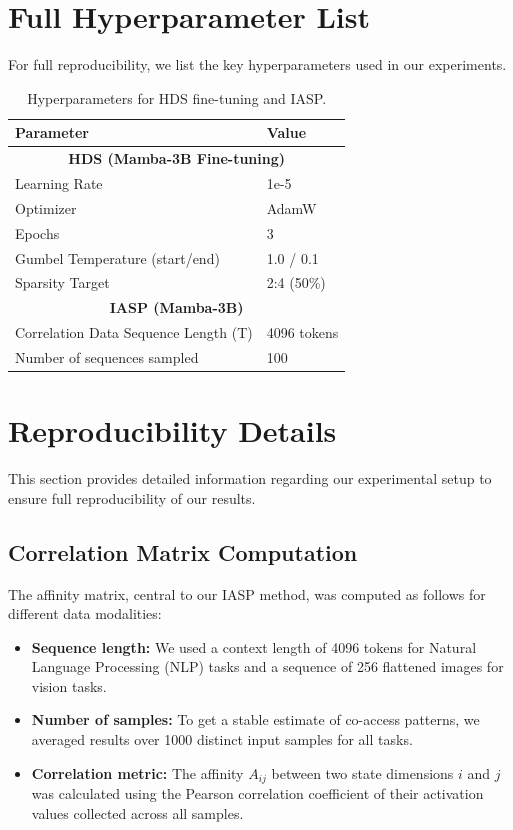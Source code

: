 \documentclass{article}
\begin{document}
\section{Full Hyperparameter List}
\label{app:hyperparams}
For full reproducibility, we list the key hyperparameters used in our experiments.
\begin{table}[htbp]
\caption{Hyperparameters for HDS fine-tuning and IASP.}
\label{tab:hyperparams}
\centering
\begin{tabular}{ll}
\toprule
\textbf{Parameter} & \textbf{Value} \\
\midrule
\multicolumn{2}{c}{\textbf{HDS (Mamba-3B Fine-tuning)}} \\
Learning Rate & 1e-5 \\
Optimizer & AdamW \\
Epochs & 3 \\
Gumbel Temperature (start/end) & 1.0 / 0.1 \\
Sparsity Target & 2:4 (50\%) \\
\midrule
\multicolumn{2}{c}{\textbf{IASP (Mamba-3B)}} \\
Correlation Data Sequence Length (T) & 4096 tokens \\
Number of sequences sampled & 100 \\
\bottomrule
\end{tabular}
\end{table}

\section{Reproducibility Details}
\label{app:reproducibility}
This section provides detailed information regarding our experimental setup to ensure full reproducibility of our results.

\subsection{Correlation Matrix Computation}
The affinity matrix, central to our IASP method, was computed as follows for different data modalities:
\begin{itemize}
    \item \textbf{Sequence length:} We used a context length of 4096 tokens for Natural Language Processing (NLP) tasks and a sequence of 256 flattened images for vision tasks.
    \item \textbf{Number of samples:} To get a stable estimate of co-access patterns, we averaged results over 1000 distinct input samples for all tasks.
    \item \textbf{Correlation metric:} The affinity $A_{ij}$ between two state dimensions $i$ and $j$ was calculated using the Pearson correlation coefficient of their activation values collected across all samples.
\end{itemize}
\end{document}
